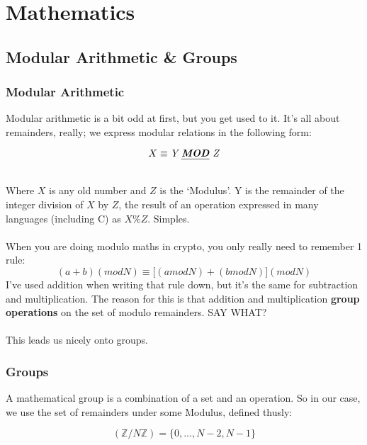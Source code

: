 
\chapter{Mathematics}
    \section{Modular Arithmetic \& Groups}
    \subsection{Modular Arithmetic}
    Modular arithmetic is a bit odd at first, but you get used to it. It's all about remainders, really; we express modular relations in the following form:\\
    \begin{figure}[htp!]
    \centering
        $$
        X \equiv \textit{Y \emph{\textbf{MOD}} Z}
        $$
    \end{figure}\\
    
    Where $X$ is any old number and $Z$ is the `Modulus'. Y is the remainder of the integer division of $X$ by $Z$, the result of an operation expressed in many languages (including C) as $X \% Z$. Simples.\\
    \\
    When you are doing modulo maths in crypto, you only really need to remember 1 rule:
    $$(a+b) (mod N) \equiv \big[(a mod N) + (b mod N)\big] (mod N)$$
    I've used addition when writing that rule down, but it's the same for subtraction and multiplication. The reason for this is that addition and multiplication \textbf{group operations} on the set of modulo remainders. SAY WHAT?\\
    \\
    This leads us nicely onto groups.

    \subsection{Groups}
    A mathematical group is a combination of a set and an operation. So in our case, we use the set of remainders under some Modulus, defined thusly:\\
    \begin{figure}[htp!]
    $$
        (\mathbb{Z}/N\mathbb{Z}) = \{0,..., N - 2, N - 1 \}
    $$
    \end{figure}\\

